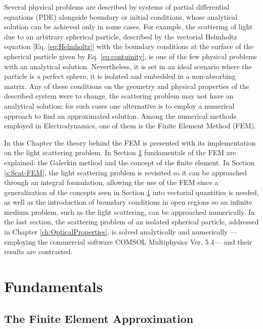 \documentclass[11pt]{Latex/Classes/PhDthesisPSnPDF}
\begin{document}
    Several physical problems are described by systems of partial differential equations (PDE) alongside boundary or initial conditions, whose analytical solution can be achieved only in some cases. For example, the scattering of light due to an arbitrary spherical particle, described by the vectorial Helmholtz equation [Eq. \eqref{eq:Helmholtz}] with the boundary conditions at the surface of the spherical particle given by Eq. \eqref{eq:contuinity},   is one of the few physical problems with an analytical solution. Nevertheless, it is set in an ideal scenario where the particle is a perfect sphere, it is isolated and embedded in a non-absorbing matrix. Any of  these conditions on the geometry and physical properties of the described system were to change, the scattering problem may not have an analytical solution;  for such cases one alternative is to employ a numerical approach to find an approximated solution.  Among the numerical methods employed in Electrodynamics, one of them is the Finite Element Method (FEM).

    In this Chapter the theory behind the FEM is presented with its implementation on the light scattering problem. In Section \ref{s:FEM-Fund} fundamentals of the FEM are explained: the Galerkin method and the concept of the finite element. In Section \ref{s:Scat-FEM}, the light scattering problem is revisited so it can be approached through an integral formulation, allowing the use of the FEM since a generalization of the concepts seen in Section \ref{s:FEM-Fund}  into vectorial quantities is needed, as well as the introduction of boundary conditions in open regions so an infinite medium problem, such as the light scattering, can be approached numerically. In the last section, the scattering problem of an isolated spherical particle, addressed in Chapter \ref{ch:OpticalProperties}, is solved analytically and numerically ---employing the commercial software COMSOL Multiphysics\texttrademark{} Ver. 5.4--- and their results are contrasted.

    \section{Fundamentals}
     \label{s:FEM-Fund}
     

        \subsection{The Finite Element Approximation}
         \label{ss:FEM-FE}
         
\end{document}
